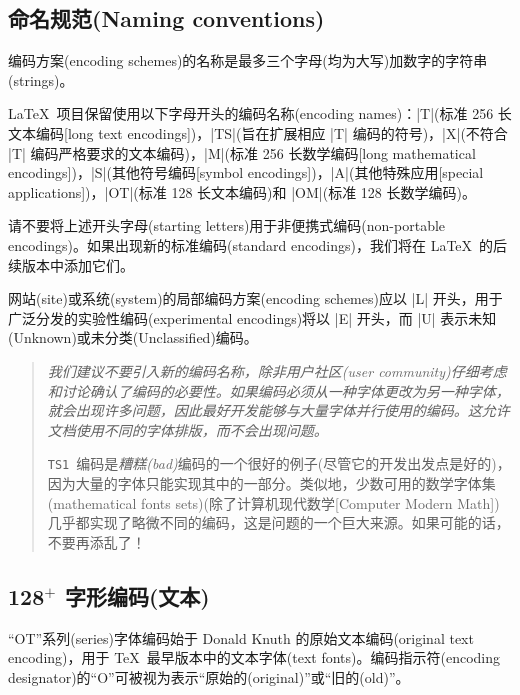 \documentclass{ltxguide}[1994/11/20]
\providecommand{\Enc}[1]{\texttt{#1}}
\begin{document}
\subsection{命名规范(Naming conventions)}

编码方案(encoding schemes)的名称是最多三个字母(均为大写)加数字的字符串(strings)。

\LaTeX\ 项目保留使用以下字母开头的编码名称(encoding names)：|T|(标准 256 长文本编码[long text encodings])，|TS|(旨在扩展相应 |T| 编码的符号)，|X|(不符合 |T| 编码严格要求的文本编码)，|M|(标准 256 长数学编码[long mathematical encodings])，|S|(其他符号编码[symbol encodings])，|A|(其他特殊应用[special applications])，|OT|(标准 128 长文本编码)和 |OM|(标准 128 长数学编码)。

请不要将上述开头字母(starting letters)用于非便携式编码(non-portable encodings)。如果出现新的标准编码(standard encodings)，我们将在 \LaTeX\ 的后续版本中添加它们。

网站(site)或系统(system)的局部编码方案(encoding schemes)应以 |L| 开头，用于广泛分发的实验性编码(experimental encodings)将以 |E| 开头，而 |U| 表示未知(Unknown)或未分类(Unclassified)编码。

\begin{quote}
  \itshape 我们建议不要引入新的编码名称，除非用户社区(user community)仔细考虑和讨论确认了编码的必要性。如果编码必须从一种字体更改为另一种字体，就会出现许多问题，因此最好开发能够与大量字体并行使用的编码。这允许文档使用不同的字体排版，而不会出现问题。

  \Enc{TS1}\ 编码是\emph{糟糕(bad)}编码的一个很好的例子(尽管它的开发出发点是好的)，因为大量的字体只能实现其中的一部分。类似地，少数可用的数学字体集(mathematical fonts sets)(除了计算机现代数学[Computer Modern Math])几乎都实现了略微不同的编码，这是问题的一个巨大来源。如果可能的话，不要再添乱了！
\end{quote}


\subsection{128$^+$ 字形编码(文本)}

“OT”系列(series)字体编码始于 Donald Knuth 的原始文本编码(original text encoding)，用于 \TeX{}\ 最早版本中的文本字体(text fonts)。编码指示符(encoding designator)的“O”可被视为表示“原始的(original)”或“旧的(old)”。
\end{document}
